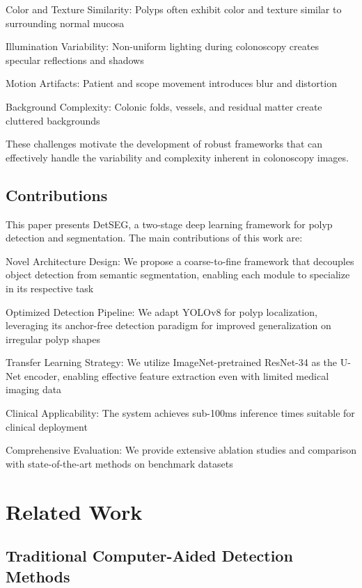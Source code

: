 \documentclass[runningheads]{llncs}
\begin{document}
\noindent Color and Texture Similarity: Polyps often exhibit color and texture similar to surrounding normal mucosa

\noindent Illumination Variability: Non-uniform lighting during colonoscopy creates specular reflections and shadows

\noindent Motion Artifacts: Patient and scope movement introduces blur and distortion

\noindent Background Complexity: Colonic folds, vessels, and residual matter create cluttered backgrounds

These challenges motivate the development of robust frameworks that can effectively handle the variability and complexity inherent in colonoscopy images.

\subsection{Contributions}

This paper presents DetSEG, a two-stage deep learning framework for polyp detection and segmentation. The main contributions of this work are:

\noindent Novel Architecture Design: We propose a coarse-to-fine framework that decouples object detection from semantic segmentation, enabling each module to specialize in its respective task

\noindent Optimized Detection Pipeline: We adapt YOLOv8 for polyp localization, leveraging its anchor-free detection paradigm for improved generalization on irregular polyp shapes

\noindent Transfer Learning Strategy: We utilize ImageNet-pretrained ResNet-34 as the U-Net encoder, enabling effective feature extraction even with limited medical imaging data

\noindent Clinical Applicability: The system achieves sub-100ms inference times suitable for clinical deployment

\noindent Comprehensive Evaluation: We provide extensive ablation studies and comparison with state-of-the-art methods on benchmark datasets

\section{Related Work}

\subsection{Traditional Computer-Aided Detection Methods}
\end{document}
